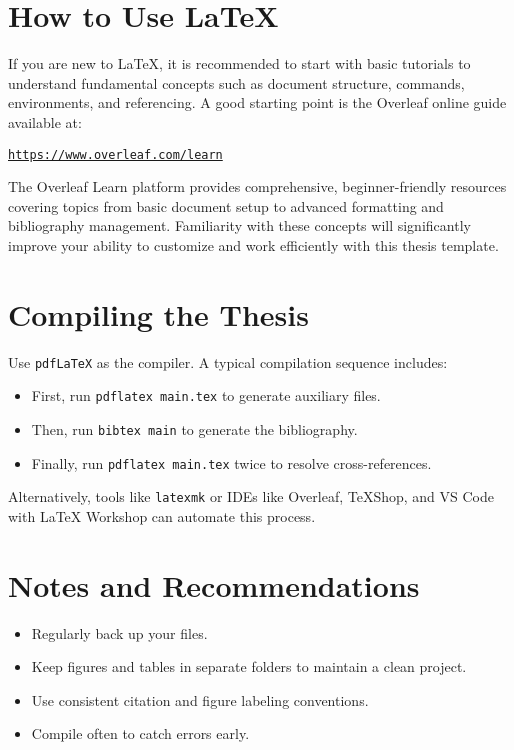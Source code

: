\section{How to Use \LaTeX}
\begin{paragraph}
If you are new to \LaTeX, it is recommended to start with basic tutorials to understand fundamental concepts such as document structure, commands, environments, and referencing. A good starting point is the Overleaf online guide available at:

\begin{center}
\href{https://www.overleaf.com/learn}{\texttt{https://www.overleaf.com/learn}}
\end{center}

The Overleaf Learn platform provides comprehensive, beginner-friendly resources covering topics from basic document setup to advanced formatting and bibliography management. Familiarity with these concepts will significantly improve your ability to customize and work efficiently with this thesis template.
\end{paragraph}

\section{Compiling the Thesis}
\begin{paragraph}
Use \texttt{pdfLaTeX} as the compiler. A typical compilation sequence includes:
\begin{itemize}[leftmargin=\paritemindent]
    \item First, run \texttt{pdflatex main.tex} to generate auxiliary files.
    \item Then, run \texttt{bibtex main} to generate the bibliography.
    \item Finally, run \texttt{pdflatex main.tex} twice to resolve cross-references.
\end{itemize}

Alternatively, tools like \texttt{latexmk} or IDEs like Overleaf, TeXShop, and VS Code with LaTeX Workshop can automate this process.
\end{paragraph}

\section{Notes and Recommendations}
\begin{paragraph}
\begin{itemize}[leftmargin=\paritemindent]
    \item Regularly back up your files.
    \item Keep figures and tables in separate folders to maintain a clean project.
    \item Use consistent citation and figure labeling conventions.
    \item Compile often to catch errors early.
\end{itemize}
\end{paragraph}
